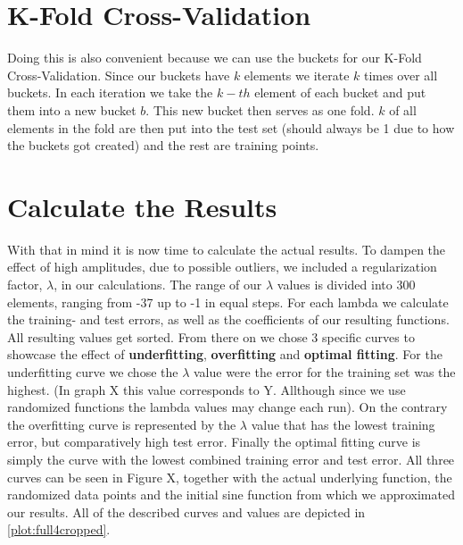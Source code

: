 \documentclass{article}
\begin{document}
	\section{K-Fold Cross-Validation}
	Doing this is also convenient because we can use the buckets for our K-Fold Cross-Validation. Since our buckets have $k$ elements we iterate $k$ times over all buckets. In each iteration we take the $k-th$ element of each bucket and put them into a new bucket $b$. This new bucket then serves as one fold. $k$ of all elements in the fold are then put into the test set (should always be 1 due to how the buckets got created) and the rest are training points. \\
	
	\section{Calculate the Results}
	With that in mind it is now time to calculate the actual results. To dampen the effect of high amplitudes, due to possible outliers, we included a regularization factor, $\lambda$, in our calculations. The range of our $\lambda$ values is divided into 300 elements, ranging from -37 up to -1 in equal steps. For each lambda we calculate the training- and test errors, as well as the coefficients of our resulting functions. All resulting values get sorted. From there on we chose 3 specific curves to showcase the effect of \textbf{underfitting}, \textbf{overfitting} and \textbf{optimal fitting}. For the underfitting curve we chose the $\lambda$ value were the error for the training set was the highest. (In graph X this value corresponds to Y. Allthough since we use randomized functions the lambda values may change each run). On the contrary the overfitting curve is represented by the $\lambda$ value that has the lowest training error, but comparatively high test error. Finally the optimal fitting curve is simply the curve with the lowest combined training error and test error. All three curves can be seen in Figure X, together with the actual underlying function, the randomized data points and the initial sine function from which we approximated our results. All of the described curves and values are depicted in \autoref{plot:full4cropped}. 
	
\end{document}
